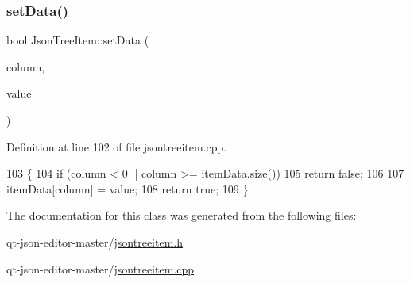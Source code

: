 \subsubsection{\texorpdfstring{set\+Data()}{setData()}}
{\footnotesize\ttfamily bool Json\+Tree\+Item\+::set\+Data (\begin{DoxyParamCaption}\item[{int}]{column,  }\item[{const Q\+Variant \&}]{value }\end{DoxyParamCaption})}



Definition at line 102 of file jsontreeitem.\+cpp.


\begin{DoxyCode}
103 \{
104     \textcolor{keywordflow}{if} (column < 0 || column >= itemData.size())
105         \textcolor{keywordflow}{return} \textcolor{keyword}{false};
106 
107     itemData[column] = value;
108     \textcolor{keywordflow}{return} \textcolor{keyword}{true};
109 \}
\end{DoxyCode}


The documentation for this class was generated from the following files\+:\begin{DoxyCompactItemize}
\item 
qt-\/json-\/editor-\/master/\hyperlink{jsontreeitem_8h}{jsontreeitem.\+h}\item 
qt-\/json-\/editor-\/master/\hyperlink{jsontreeitem_8cpp}{jsontreeitem.\+cpp}\end{DoxyCompactItemize}
